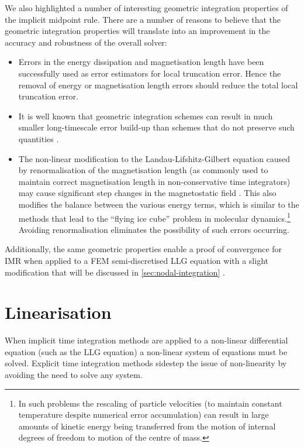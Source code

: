 We also highlighted a number of interesting geometric integration properties of the implicit midpoint rule.
There are a number of reasons to believe that the geometric integration properties will translate into an improvement in the accuracy and robustness of the overall solver:
\begin{itemize}
\item Errors in the energy dissipation \cite{Albuquerque2001} and magnetisation length \cite{Chantrell2001} have been successfully used as error estimators for local truncation error.
Hence the removal of energy or magnetisation length errors should reduce the total local truncation error.
\item It is well known that geometric integration schemes can result in much smaller long-timescale error build-up than schemes that do not preserve such quantities \cite[77]{Iserles2009}.
\item The non-linear modification to the Landau-Lifshitz-Gilbert equation caused by renormalisation of the magnetisation length (as commonly used to maintain correct magnetisation length in non-conservative time integrators) may cause significant step changes in the magnetostatic field \cite{Lewis2003}.
This also modifies the balance between the various energy terms, which is similar to the methods that lead to the ``flying ice cube'' problem \cite{Harvey1998} in molecular dynamics.\footnote{In such problems the rescaling of particle velocities (to maintain constant temperature despite numerical error accumulation) can result in large amounts of kinetic energy being transferred from the motion of internal degrees of freedom to motion of the centre of mass.}
Avoiding renormalisation eliminates the possibility of such errors occurring.
\end{itemize}

Additionally, the same geometric properties enable a proof of convergence for IMR when applied to a FEM semi-discretised LLG equation with a slight modification that will be discussed in \cref{sec:nodal-integration} \cite{Bartels2006}.


\section{Linearisation}
\label{sec:linearisation}

When implicit time integration methods are applied to a non-linear differential equation (such as the LLG equation) a non-linear system of equations must be solved.
Explicit time integration methods sidestep the issue of non-linearity by avoiding the need to solve any system.

